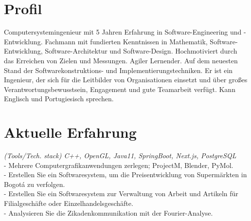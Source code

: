 \documentclass[]{CV-JuanCamiloFlorez}
\begin{document}
\begin{minipage}[t]{0.66\textwidth} 


\section{Profil}
Computersystemingenieur mit 5 Jahren Erfahrung in Software-Engineering und -Entwicklung. Fachmann mit fundierten Kenntnissen in Mathematik, Software-Entwicklung, Software-Architektur und Software-Design. Hochmotiviert durch das Erreichen von Zielen und Messungen. Agiler Lernender. Auf dem neuesten Stand der Softwarekonstruktions- und Implementierungstechniken. Er ist ein Ingenieur, der sich für die Leitbilder von Organisationen einsetzt und über großes Verantwortungsbewusstsein, Engagement und gute Teamarbeit verfügt. Kann Englisch und Portugiesisch sprechen.


\sectionsep

\section{Aktuelle Erfahrung}
    \textit{(Tools/Tech. stack) C++, OpenGL, Java11, SpringBoot, Next.js, PostgreSQL} \\
        - Mehrere Computergrafikanwendungen zerlegen; ProjectM, Blender, PyMol. \\
        - Erstellen Sie ein Softwaresystem, um die Preisentwicklung von Supermärkten in Bogotá zu verfolgen. \\
        - Erstellen Sie ein Softwaresystem zur Verwaltung von Arbeit und Artikeln für Filialgeschäfte oder Einzelhandelsgeschäfte. \\
        - Analysieren Sie die Zikadenkommunikation mit der Fourier-Analyse. \\
        \sectionsep


\end{minipage}
\end{document}

